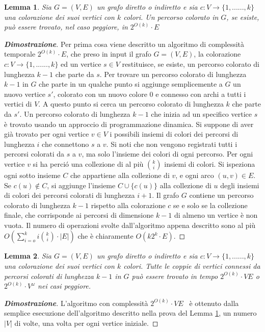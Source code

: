 \newtheorem{lemma}{Lemma}[section]
\begin{lemma}
	\label{lemma1}
	Sia $G=(V,E)$ un grafo diretto o indiretto e sia $c:V\rightarrow\{1,......,k\}$ una colorazione dei suoi vertici con $k$ colori. Un percorso colorato in $G$, se esiste, pu\`o essere trovato, nel caso peggiore, in $2^{O(k)} \cdot E$
\end{lemma}
\begin{proof}[\textbf{Dimostrazione}]

	Per prima cosa viene descritto un algoritmo di complessit\`a temporale $2^{O(k)} \cdot E$, che preso in input il grafo $G=(V,E)$, la colorazione $c:V\rightarrow\{1,......,k\}$ ed un vertice $s\in{V}$ restituisce, se esiste, un percorso colorato di lunghezza $k-1$ che parte da $s$.
	Per trovare un percorso colorato di lunghezza $k-1$ in $G$ che parte in un qualche punto si aggiunge semplicemente a $G$  un nuovo vertice $s'$, colorato con un nuovo colore $0$ e connesso con archi a tutti i vertici di $V$. A questo punto si cerca un percorso colorato di lunghezza $k$ che parte da $s'$.
	Un percorso colorato di lunghezza $k-1$ che inizia ad un specifico vertice $s$ \`e trovato usando un approccio di programmazione dinamica.
	Si suppone di aver gi\`a trovato per ogni vertice $v\in{V}$ i possibili insiemi di colori dei percorsi di lunghezza $i$ che connettono $s$ a $v$.
	Si noti che non vengono registrati tutti i percorsi colorati da $s$ a $v$, ma solo l'insieme dei colori di ogni percorso.
	Per ogni vertice $v$ si ha perci\'o una collezione di al pi\`u $\binom {k}{i}$ insiemi di colori.
	Si ispeziona ogni sotto insieme $C$ che appartiene alla collezione di $v$, e ogni arco $(u,v)\in{E}$. 
	Se $c(u)\notin{C}$, si aggiunge l'insieme $C\cup\{c(u)\}$ alla collezione di $u$ degli insiemi di colori dei percorsi colorati di lunghezza $i+1$.
	Il grafo $G$ contiene un percorso colorato di lunghezza $k-1$ rispetto alla colorazione $c$ se e solo se la collezione finale, che corrisponde ai percorsi di dimensione $k-1$ di almeno un vertice \`e non vuota.
	Il numero di operazioni svolte dall'algoritmo appena descritto sono al pi\`u $O(\sum_{i=o}^{k} i \binom{k}{i} \cdot |E|)$ che \`e chiaramente $O(k2^{k}\cdot{E})$.
\end{proof}

\begin{lemma}
	\label{lemma2}
	Sia $G=(V,E)$ un grafo diretto o indiretto e sia $c:V\rightarrow\{1,......,k\}$ una colorazione dei suoi vertici con $k$ colori. Tutte le coppie di vertici connessi da percorsi colorati di lunghezza $k-1$ in $G$ pu\`o essere trovato in tempo $2^{O(k)} \cdot{VE}$ o $2^{O(k)}\cdot {V^{\omega}}$ nei casi peggiore.
\end{lemma}

\begin{proof}[\textbf{Dimostrazione}]
	L'algoritmo con complessit\`a $2^{O(k)} \cdot{VE}$  \ 
	\`e ottenuto dalla semplice esecuzione dell'algoritmo descritto nella prova del Lemma \ref{lemma1}, un numero $|V|$ di volte, una volta per ogni vertice iniziale.
\end{proof}
	

